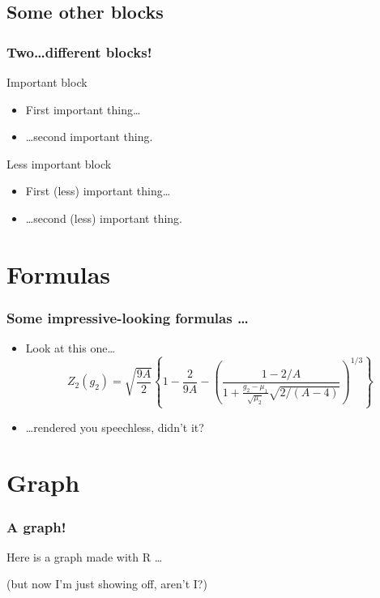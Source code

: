 \documentclass{beamer} 						%
\begin{document}
\subsection{Some other blocks}
\begin{frame}
    \frametitle{Two\ldots different blocks!} 
	
	\begin{alertblock}{Important block}
	    \begin{itemize}
		\item First important thing\ldots
		\pause
		\item \ldots second important thing.
	    \end{itemize}
     \end{alertblock}	
	
	\pause

	\begin{block}{Less important block}
	    \begin{itemize}
		\item First (less) important thing\ldots
		\pause
		\item \ldots second (less) important thing.
	    \end{itemize}
     \end{block}	
\end{frame}

\section{Formulas}
\begin{frame}
    \frametitle{Some impressive-looking formulas \ldots}
    \begin{itemize}
	\item Look at this one\ldots
	\pause
	\[ 	Z_2(g_2) = \sqrt{\frac{9A}{2}} \left\{1 - \frac{2}{9A} - \left(\frac{ 1-2/A }{ 1+\frac{g_2-\mu_1}{\sqrt{\mu_2}}\sqrt{2/(A-4)} }\right)^{\!1/3}\right\}  \]
	\pause
	\item \ldots rendered you speechless, didn't it?
		
	\end{itemize}
\end{frame}

\section{Graph}
\begin{frame}
    \frametitle{A graph!}
	\pause    
    Here is a graph made with R \ldots
	\begin{figure}[hb]
	\begin{center}
	\end{center}
	\end{figure}
	\pause
	(but now I'm just showing off, aren't I?)
	
\end{frame}
\end{document}
